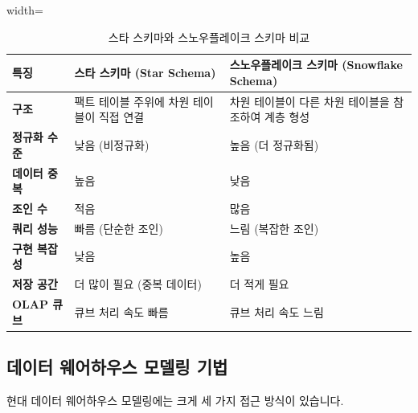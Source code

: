\documentclass[11pt,a4paper]{article}
\begin{document}
\begin{table}[h!]
\centering
\caption{스타 스키마와 스노우플레이크 스키마 비교}
\label{tab:star_snowflake_comparison}
\begin{adjustbox}{width=\textwidth}
\begin{tabular}{p{}p{}p{}}
\toprule
\textbf{특징} & \textbf{스타 스키마 (Star Schema)} & \textbf{스노우플레이크 스키마 (Snowflake Schema)} \\
\midrule
\textbf{구조} & 팩트 테이블 주위에 차원 테이블이 직접 연결 & 차원 테이블이 다른 차원 테이블을 참조하여 계층 형성 \\
\textbf{정규화 수준} & 낮음 (비정규화) & 높음 (더 정규화됨) \\
\textbf{데이터 중복} & 높음 & 낮음 \\
\textbf{조인 수} & 적음 & 많음 \\
\textbf{쿼리 성능} & 빠름 (단순한 조인) & 느림 (복잡한 조인) \\
\textbf{구현 복잡성} & 낮음 & 높음 \\
\textbf{저장 공간} & 더 많이 필요 (중복 데이터) & 더 적게 필요 \\
\textbf{OLAP 큐브} & 큐브 처리 속도 빠름 & 큐브 처리 속도 느림 \\
\bottomrule
\end{tabular}
\end{adjustbox}
\end{table}

\subsection{데이터 웨어하우스 모델링 기법}
현대 데이터 웨어하우스 모델링에는 크게 세 가지 접근 방식이 있습니다.
\end{document}
